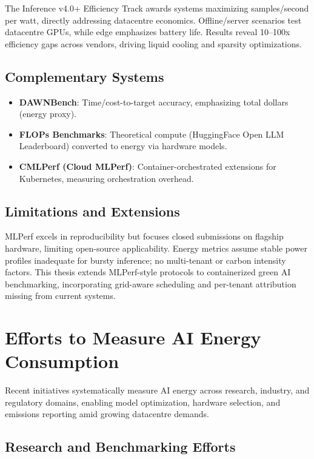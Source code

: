 The Inference v4.0+ Efficiency Track awards systems maximizing samples/second per watt, directly addressing datacentre economics. Offline/server scenarios test datacentre GPUs, while edge emphasizes battery life. Results reveal 10--100x efficiency gaps across vendors, driving liquid cooling and sparsity optimizations.

\subsection{Complementary Systems}

\begin{itemize}
    \item \textbf{DAWNBench}: Time/cost-to-target accuracy, emphasizing total dollars (energy proxy).
    \item \textbf{FLOPs Benchmarks}: Theoretical compute (HuggingFace Open LLM Leaderboard) converted to energy via hardware models.
    \item \textbf{CMLPerf (Cloud MLPerf)}: Container-orchestrated extensions for Kubernetes, measuring orchestration overhead.
\end{itemize}

\subsection{Limitations and Extensions}

MLPerf excels in reproducibility but focuses closed submissions on flagship hardware, limiting open-source applicability. Energy metrics assume stable power profiles inadequate for bursty inference; no multi-tenant or carbon intensity factors. This thesis extends MLPerf-style protocols to containerized green AI benchmarking, incorporating grid-aware scheduling and per-tenant attribution missing from current systems.\@

\section{Efforts to Measure AI Energy Consumption}

Recent initiatives systematically measure AI energy across research, industry, and regulatory domains, enabling model optimization, hardware selection, and emissions reporting amid growing datacentre demands.

\subsection{Research and Benchmarking Efforts}

